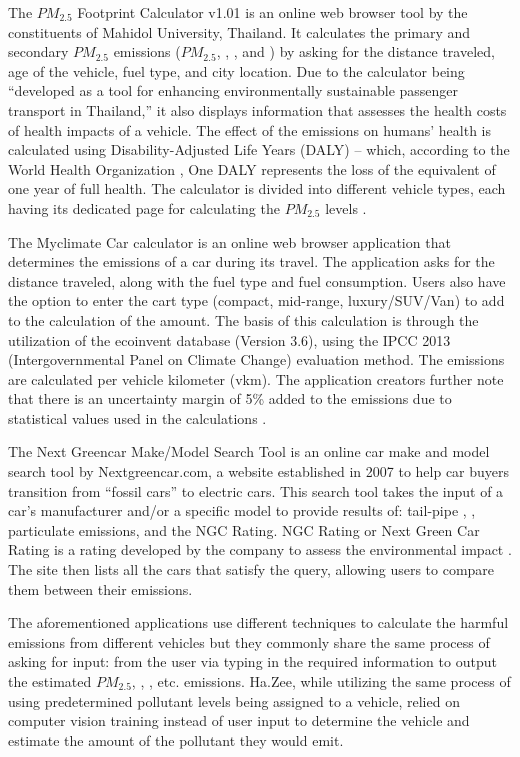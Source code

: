 	The $PM_{2.5}$ Footprint Calculator v1.01 is an online web browser tool by the constituents of Mahidol University, Thailand. It calculates the primary and secondary $PM_{2.5}$ emissions ($PM_{2.5}$, , , and ) by asking for the distance traveled, age of the vehicle, fuel type, and city location. Due to the calculator being “developed as a tool for enhancing environmentally sustainable passenger transport in Thailand,” it also displays information that assesses the health costs of health impacts of a vehicle. The effect of the emissions on humans’ health is calculated using  Disability-Adjusted Life Years (DALY) – which, according to the World Health Organization \citeyear{WHO_nd}, One DALY represents the loss of the equivalent of one year of full health. The calculator is divided into different vehicle types, each having its dedicated page for calculating the $PM_{2.5}$ levels \cite{pm25_footprint}.
	
	

	The Myclimate Car calculator is an online web browser application that determines the  emissions of a car during its travel. The application asks for the distance traveled, along with the fuel type and fuel consumption. Users also have the option to enter the cart type (compact, mid-range, luxury/SUV/Van) to add to the calculation of the  amount.  The basis of this calculation is through the utilization of the ecoinvent database (Version 3.6), using the IPCC 2013  (Intergovernmental Panel on Climate Change) evaluation method. The emissions are calculated per vehicle kilometer (vkm). The application creators further note that there is an uncertainty margin of 5\% added to the emissions due to statistical values used in the calculations \cite{MCF_ND}.

	The Next Greencar Make/Model Search Tool is an online car make and model search tool by Nextgreencar.com, a website established in 2007 to help car buyers transition from “fossil cars” to electric cars. This search tool takes the input of a car’s manufacturer and/or a specific model to provide results of: tail-pipe , , particulate emissions, and the NGC Rating. NGC Rating or Next Green Car Rating is a rating developed by the company to assess the environmental impact \cite{Lilly_ND}.  The site then lists all the cars that satisfy the query, allowing users to compare them between their emissions. 

	The aforementioned applications use different techniques to calculate the harmful emissions from different vehicles but they commonly share the same process of asking for input: from the user via typing in the required information to output the estimated $PM_{2.5}$, , , etc. emissions. Ha.Zee, while utilizing the same process of using predetermined pollutant levels being assigned to a vehicle, relied on computer vision training instead of user input to determine the vehicle and estimate the amount of the pollutant they would emit.

